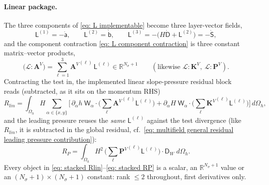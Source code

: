 \documentclass{article}
\newcommand{\Ns}{N_\sigma}
\newcommand{\VmA}{\mathbf{A}^V}
\newcommand{\VmK}{\mathbf{K}^V}
\newcommand{\VmP}{\mathbf{P}^V}
\newcommand{\Oh}{\Omega_h}
\newcommand{\VL}{\boldsymbol{\mathcal{L}}}
\begin{document}
\paragraph{Linear package.} The three components of \eqref{eq: L implementable} become three layer-vector fields,
\begin{equation}
    \mathsf{L}^{(1)} = -\dot{\mathsf{a}}, \qquad
    \mathsf{L}^{(2)} = \dot{\mathsf{b}}, \qquad
    \mathsf{L}^{(3)} = -\big(H\dot{\mathsf{D}} + \mathsf{L}^{(2)}\big) = -\dot{\mathsf{S}},
    \label{eq: stacked L}
\end{equation}
and the component contraction \eqref{eq: L component contraction} is three constant matrix--vector products,
$$\big(\VL:\VmA\big) = \sum_{\ell=1}^{3} {\VmA}^{(\ell)}\,\mathsf{L}^{(\ell)} \in \mathbb{R}^{\Ns+1}
\qquad(\text{likewise } \VL:\VmK,\ \VL:\VmP).$$
Contracting the test in, the implemented linear slope-pressure residual block reads (subtracted, as it sits on the momentum RHS)
\begin{equation}
    R_{lin} = \int_{\Oh} H\sum_{\alpha\in\{x,y\}} \Big[\,\partial_\alpha h\; \mathsf{W}_\alpha\!\cdot\!\big(\textstyle\sum_\ell {\VmA}^{(\ell)}\mathsf{L}^{(\ell)}\big)
    + \partial_\alpha H\; \mathsf{W}_\alpha\!\cdot\!\big(\textstyle\sum_\ell {\VmK}^{(\ell)}\mathsf{L}^{(\ell)}\big)\Big]\, d\Oh ,
    \label{eq: stacked Rlin}
\end{equation}
and the leading pressure reuses the \emph{same} $\mathsf{L}^{(\ell)}$ against the test divergence (like $R_{lin}$, it is subtracted in the global residual, cf.\ \eqref{eq: multifield general residual leading pressure contribution}):
\begin{equation}
    R_{P} = \int_{\Oh} H^2\, \Big(\textstyle\sum_\ell {\VmP}^{(\ell)}\mathsf{L}^{(\ell)}\Big)\cdot\mathsf{D}_W \; d\Oh .
    \label{eq: stacked RP}
\end{equation}
Every object in \eqref{eq: stacked Rlin}--\eqref{eq: stacked RP} is a scalar, an $\mathbb{R}^{\Ns+1}$ value or an $(\Ns{+}1)\times(\Ns{+}1)$ constant: rank $\le 2$ throughout, first derivatives only.
\end{document}
